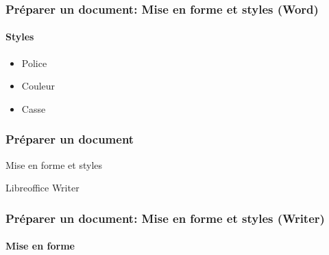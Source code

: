 \documentclass[xcolor=table]{beamer}
\begin{document}
\begin{frame}
\frametitle{Préparer un document: Mise en forme et styles (Word)}
\framesubtitle{Styles}

\begin{minipage}{0.58\textwidth}
	\begin{itemize}
		\item Police
		\item Couleur 
		\item Casse 
	\end{itemize}
\end{minipage}
\begin{minipage}{0.4\textwidth}
	
	\vspace{12pt}
	
\end{minipage}

\end{frame}

\begin{frame}
\frametitle{Préparer un document}

\begin{center}
	Mise en forme et styles 
	
	Libreoffice Writer
\end{center}

\end{frame}

\begin{frame}
\frametitle{Préparer un document: Mise en forme et styles (Writer)}
\framesubtitle{Mise en forme}

\begin{minipage}{0.48\textwidth}
\end{minipage}
\begin{minipage}{0.50\textwidth}
%
\end{minipage}

\end{frame}
\end{document}
